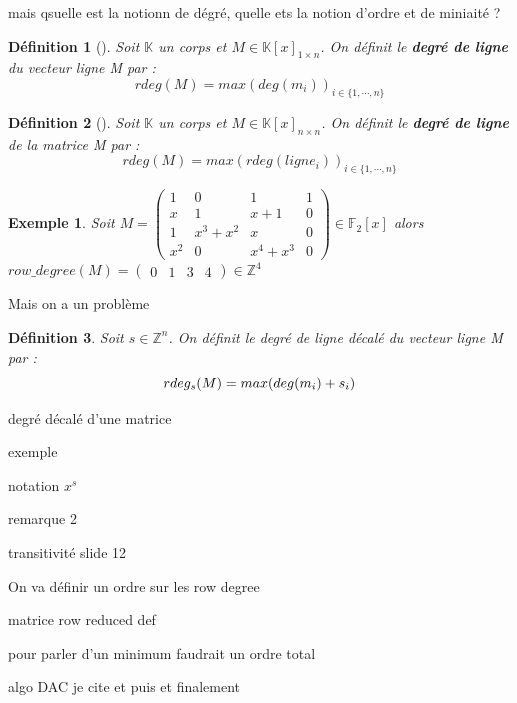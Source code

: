 \documentclass[a4paper,12pt]{report}  %
\theoremstyle{definitionstyle}
\newtheorem{definition}{Définition}[chapter] %
\theoremstyle{examplestyle}
\newtheorem{example}{Exemple}[chapter] %
\theoremstyle{remarkstyle}
\theoremstyle{propositionstyle}
\theoremstyle{theoremstyle}
\theoremstyle{proofstyle}
\begin{document}
	mais qsuelle est la notionn de dégré, quelle ets la notion d'ordre et de miniaité ?
	
	
	\begin{definition}[\cite{clef_unique_0}]
		Soit $\mathbb{K}$ un corps et $M \in \mathbb{K}[x]_{1 \times n}$. On définit le \textbf{degré de ligne} du vecteur ligne M par : 
		$$rdeg(M)=max(deg(m_i))_{i\in\{1, \cdots, n\}}$$
	\end{definition}
	
	\begin{definition}[\cite{clef_unique_0}]
		Soit $\mathbb{K}$ un corps et $M \in \mathbb{K}[x]_{n \times n}$. On définit le \textbf{degré de ligne} de la matrice M par :
		$$rdeg(M)=max(rdeg(ligne_i))_{i\in\{1, \cdots, n\}}$$
	\end{definition}
	
	\begin{example}
		Soit $M =
		\left(\begin{array}{rrrr}
			1 & 0 & 1 & 1 \\
			x & 1 & x + 1 & 0 \\
			1 & x^{3} + x^{2} & x & 0 \\
			x^{2} & 0 & x^{4} + x^{3} & 0
		\end{array}\right) \in \mathbb{F}_2[x]
		$
		alors $row\_degree(M)=\left(\begin{array}{rrrr}
			0 & 1 & 3 & 4
		\end{array}\right)\in \mathbb{Z}^4$
		
	\end{example}
	
	Mais on a un problème
	
	\begin{definition}
		Soit $s \in \mathbb{Z}^n$. On définit le degré de ligne décalé du vecteur ligne M par :
		$$rdeg_s(M)=max(deg(m_i)+s_i\\)$$
	\end{definition}
	degré décalé d'une matrice
	
	exemple
	
	notation $x^s$
	
	remarque 2
	
	transitivité slide 12
	
	On va définir un ordre sur les row degree
	
	
	
	matrice row reduced def
	
	
	pour parler d'un minimum faudrait un ordre total
	
	algo DAC
	 je cite \cite{clef_unique_2} et puis \cite{clef_unique_3} et finalement \cite{clef_unique_4}
	
\end{document}
